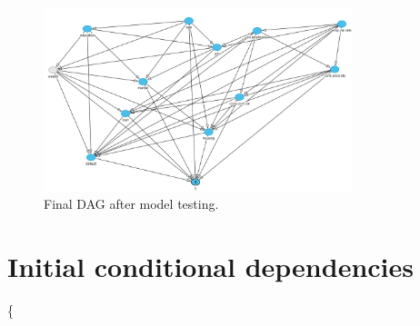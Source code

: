 \documentclass[11pt,]{article}
\begin{document}
\label{sec:final_dag}

\begin{figure}[h]
    \centering
    \includegraphics[width=0.8\textwidth]{images/final_dag}
    \caption{Final DAG after model testing.}
    \label{fig:final_dag}
\end{figure}

\newpage

\hypertarget{initial-conditional-dependencies}{%
\section{Initial conditional
dependencies}\label{initial-conditional-dependencies}}

\label{sec:initial_conditional_dependencies}

\{\tiny
\end{document}
